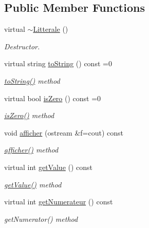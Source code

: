 \subsection*{Public Member Functions}
\begin{DoxyCompactItemize}
\item 
virtual \hyperlink{class_litterale_abd6b3faa8cda262bb5fab57e1e323090}{$\sim$\+Litterale} ()
\begin{DoxyCompactList}\small\item\em Destructor. \end{DoxyCompactList}\item 
virtual string \hyperlink{class_litterale_a3041839e5494df2c93bff2c5cb83ce1f}{to\+String} () const  =0
\begin{DoxyCompactList}\small\item\em \hyperlink{class_litterale_a3041839e5494df2c93bff2c5cb83ce1f}{to\+String()} method \end{DoxyCompactList}\item 
virtual bool \hyperlink{class_litterale_a535fc431d96954754b7a729404df4a79}{is\+Zero} () const  =0
\begin{DoxyCompactList}\small\item\em \hyperlink{class_litterale_a535fc431d96954754b7a729404df4a79}{is\+Zero()} method \end{DoxyCompactList}\item 
void \hyperlink{class_litterale_ae33587fb3c4a929c9ee29d9c6b49aea6}{afficher} (ostream \&f=cout) const 
\begin{DoxyCompactList}\small\item\em \hyperlink{class_litterale_ae33587fb3c4a929c9ee29d9c6b49aea6}{afficher()} method \end{DoxyCompactList}\item 
virtual int \hyperlink{class_litterale_a9cd3d639341cb797bcf2b6400d6ad43d}{get\+Value} () const 
\begin{DoxyCompactList}\small\item\em \hyperlink{class_litterale_a9cd3d639341cb797bcf2b6400d6ad43d}{get\+Value()} method \end{DoxyCompactList}\item 
virtual int \hyperlink{class_litterale_a6d3e582118775a3a0362154ae1a8cbda}{get\+Numerateur} () const 
\begin{DoxyCompactList}\small\item\em get\+Numerator() method \end{DoxyCompactList}\item 

\end{DoxyCompactItemize}
